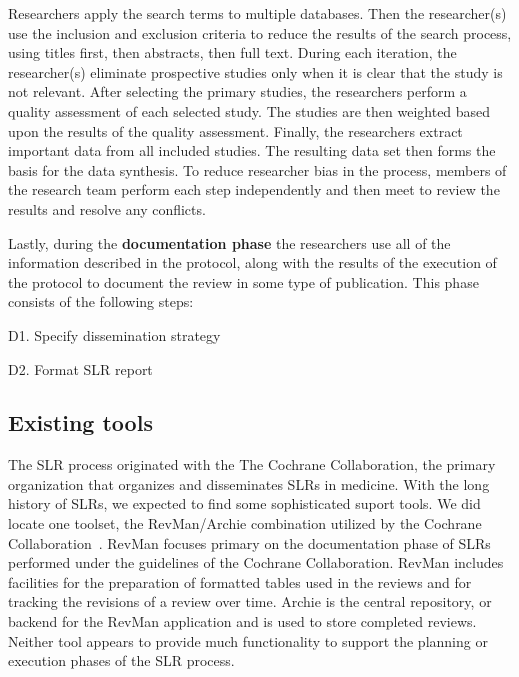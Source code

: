 Researchers apply the search terms to multiple databases. Then the researcher(s) use the inclusion and exclusion criteria to reduce the results of the search process, using titles first, then abstracts, then full text. During each iteration, the researcher(s) eliminate prospective studies only when it is clear that the study is not relevant. After selecting the primary studies, the researchers perform a quality assessment of each selected study. The studies are then weighted based upon the results of the quality assessment. Finally, the researchers extract important data from all included studies. The resulting data set then forms the basis for the data synthesis. To reduce researcher bias in the process, members of the research team perform each step independently and then meet to review the results and resolve any conflicts. 

Lastly, during the \textbf{documentation phase} the researchers use all of the information described in the protocol, along with the results of the execution of the protocol to document the review in some type of publication. This phase consists of the following steps:
\vspace*{-4pt}
\begin{enumerate*}
	\item[D1.]{Specify dissemination strategy}
	\item[D2.]{Format SLR report}
\end{enumerate*}
\vspace*{-4pt}

\subsection{Existing tools}
\label{sub:existing:tools}
The SLR process originated with the The Cochrane Collaboration, the primary organization that organizes and disseminates SLRs in medicine. With the long history of SLRs, we expected to find some sophisticated suport tools. We did locate one toolset, the RevMan/Archie combination utilized by the Cochrane Collaboration~\cite{RevMan:11}. RevMan focuses primary on the documentation phase of SLRs performed under the guidelines of the Cochrane Collaboration.  RevMan includes facilities for the preparation of formatted tables used in the reviews and for tracking the revisions of a review over time.  Archie is the central repository, or backend for the RevMan application and is used to store completed reviews. Neither tool appears to provide much functionality to support the planning or execution phases of the SLR process.

